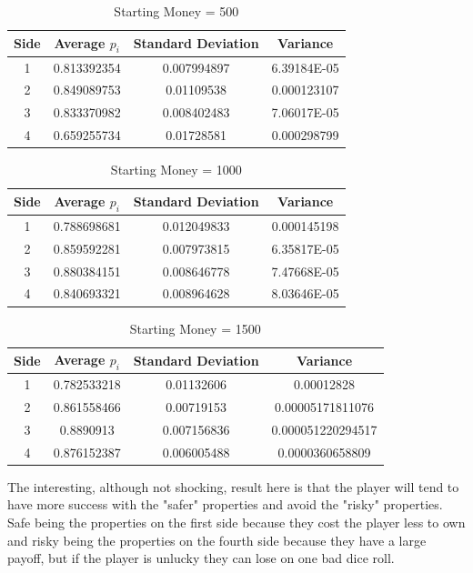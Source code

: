 \documentclass{article}
\begin{document}
\begin{table}[h!]
\centering
\caption{Starting Money = 500}
\label{tab:table1}
\begin{tabular}{|c|c|c|c|}
\hline
Side  & Average $p_i$ & Standard Deviation & Variance\\
\hline
1 &  0.813392354 & 0.007994897 & 6.39184E-05\\
2 &  0.849089753 & 0.01109538 & 0.000123107\\
3 & 0.833370982 & 0.008402483 & 7.06017E-05\\
4 & 0.659255734 & 0.01728581 & 0.000298799\\
\hline
\end{tabular}
\end{table}

\begin{table}[h!]
\centering
\caption{Starting Money = 1000}
\label{tab:table1}
\begin{tabular}{|c|c|c|c|}
\hline
Side  & Average $p_i$ & Standard Deviation & Variance\\
\hline
1 &  0.788698681 & 0.012049833 & 0.000145198\\
2 &  0.859592281 & 0.007973815 & 6.35817E-05\\
3 & 0.880384151 & 0.008646778 & 7.47668E-05\\
4 & 0.840693321 & 0.008964628 & 8.03646E-05\\
\hline
\end{tabular}
\end{table}

\begin{table}[h!]
\centering
\caption{Starting Money = 1500}
\label{tab:table1}
\begin{tabular}{|c|c|c|c|}
\hline
Side  & Average $p_i$ & Standard Deviation & Variance\\
\hline
1 &  0.782533218 & 0.01132606 & 0.00012828\\
2 &  0.861558466 & 0.00719153 & 0.00005171811076\\
3 & 0.8890913 & 0.007156836 & 0.000051220294517\\
4 & 0.876152387 & 0.006005488 & 0.0000360658809\\
\hline
\end{tabular}
\end{table}

The interesting, although not shocking, result here is that the player will tend to have more success with the "safer" properties and avoid the "risky" properties.  Safe being the properties on the first side because they cost the player less to own and risky being the properties on the fourth side because they have a large payoff, but if the player is unlucky they can lose on one bad dice roll.
\end{document}
